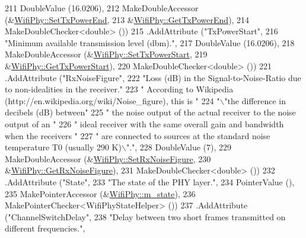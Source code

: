 \begin{DoxyCode}
211                    DoubleValue (16.0206),
212                    MakeDoubleAccessor (&\hyperlink{classns3_1_1WifiPhy_a98951174ec783a5ef4f63e478f08149a}{WifiPhy::SetTxPowerEnd},
213                                        &\hyperlink{classns3_1_1WifiPhy_a888689f2b8efd16e30a87b4c11c935f7}{WifiPhy::GetTxPowerEnd}),
214                    MakeDoubleChecker<double> ())
215     .AddAttribute (\textcolor{stringliteral}{"TxPowerStart"},
216                    \textcolor{stringliteral}{"Minimum available transmission level (dbm)."},
217                    DoubleValue (16.0206),
218                    MakeDoubleAccessor (&\hyperlink{classns3_1_1WifiPhy_af92f19ae125dbfa0473526645ba43287}{WifiPhy::SetTxPowerStart},
219                                        &\hyperlink{classns3_1_1WifiPhy_a6bdd8d2fba5a318b7d35a864acdb2e20}{WifiPhy::GetTxPowerStart}),
220                    MakeDoubleChecker<double> ())
221     .AddAttribute (\textcolor{stringliteral}{"RxNoiseFigure"},
222                    \textcolor{stringliteral}{"Loss (dB) in the Signal-to-Noise-Ratio due to non-idealities in the receiver."}
223                    \textcolor{stringliteral}{" According to Wikipedia (http://en.wikipedia.org/wiki/Noise\_figure), this is "}
224                    \textcolor{stringliteral}{"\(\backslash\)"the difference in decibels (dB) between"}
225                    \textcolor{stringliteral}{" the noise output of the actual receiver to the noise output of an "}
226                    \textcolor{stringliteral}{" ideal receiver with the same overall gain and bandwidth when the receivers "}
227                    \textcolor{stringliteral}{" are connected to sources at the standard noise temperature T0 (usually 290 K)\(\backslash\)"."},
228                    DoubleValue (7),
229                    MakeDoubleAccessor (&\hyperlink{classns3_1_1WifiPhy_ad570662ad0183e7427927f854da13b5b}{WifiPhy::SetRxNoiseFigure},
230                                        &\hyperlink{classns3_1_1WifiPhy_aa25fdece132cb7ac83f95b41196fd69b}{WifiPhy::GetRxNoiseFigure}),
231                    MakeDoubleChecker<double> ())
232     .AddAttribute (\textcolor{stringliteral}{"State"},
233                    \textcolor{stringliteral}{"The state of the PHY layer."},
234                    PointerValue (),
235                    MakePointerAccessor (&\hyperlink{classns3_1_1WifiPhy_a020dae8902d858e3d121aa7a67ca2528}{WifiPhy::m\_state}),
236                    MakePointerChecker<WifiPhyStateHelper> ())
237     .AddAttribute (\textcolor{stringliteral}{"ChannelSwitchDelay"},
238                    \textcolor{stringliteral}{"Delay between two short frames transmitted on different frequencies."},

\end{DoxyCode}
